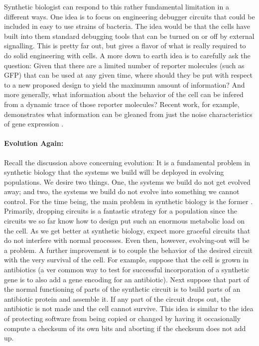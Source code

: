 Synthetic biologist can respond to this rather fundamental limitation
in a different ways. One idea is to focus on engineering debugger
circuits that could be included in easy to use strains of
bacteria. The idea would be that the cells have built into them
standard debugging tools that can be turned on or off by external
signalling. This is pretty far out, but gives a flavor of what is
really required to do solid engineering with cells. A more down to
earth idea is to carefully ask the question: Given that there are a
limited number of reporter molecules (such as GFP) that can be used at
any given time, where should they be put with respect to a new
proposed design to yield the maximumn amount of information? And more
generally, what information about the behavior of the cell can be
infered from a dynamic trace of those reporter molecules? Recent work,
for example, demonstrates what information can be gleaned from just
the noise characteristics of gene expression
\cite{murray-noise,thorsely-egbert-klavins-in-progress}.

\paragraph{Evolution Again:} Recall the discussion above concerning
evolution: It is a fundamental problem in synthetic biology that the
systems we build will be deployed in evolving populations. We desire
two things. One, the systems we build do not get evolved away; and
two, the systems we build do not evolve into something we cannot
control. For the time being, the main problem in synthetic biology is
the former \cite{evolve-away}. Primarily, dropping circuits is a
fantastic strategy for a population since the circuits we so far know
how to design put such an enormous metabolic load on the cell. As we
get better at synthetic biology, expect more graceful circuits that do
not interfere with normal processes. Even then, however, evolving-out
will be a problem. A further improvement is to couple the behavior of
the desired circuit with the very survival of the cell. For example,
suppose that the cell is grown in antibiotics (a ver common way to
test for successful incorporation of a synthetic gene is to also add a
gene encoding for an antibiotic). Next suppose that part of the normal
functioning of parts of the synthetic circuit is to build parts of an
antibiotic protein and assemble it. If any part of the circuit drops
out, the antibiotic is not made and the cell cannot survive. This idea
is similar to the idea of protecting software from being copied or
changed by having it occasionally compute a checksum of its own bits
and aborting if the checksum does not add up.

